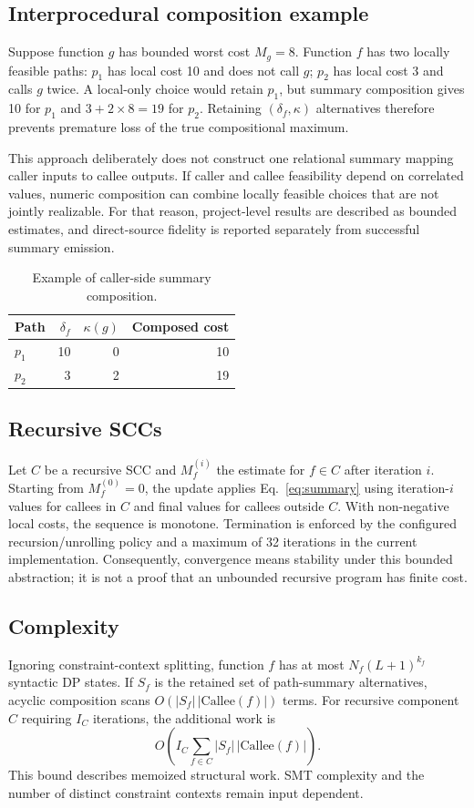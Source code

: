 \documentclass[10pt,conference]{IEEEtran}
\begin{document}
\subsection{Interprocedural composition example}
Suppose function $g$ has bounded worst cost $M_g=8$. Function $f$ has two locally feasible paths: $p_1$ has local cost 10 and does not call $g$; $p_2$ has local cost 3 and calls $g$ twice. A local-only choice would retain $p_1$, but summary composition gives 10 for $p_1$ and $3+2\times8=19$ for $p_2$. Retaining $(\delta_f,\kappa)$ alternatives therefore prevents premature loss of the true compositional maximum.

This approach deliberately does not construct one relational summary mapping caller inputs to callee outputs. If caller and callee feasibility depend on correlated values, numeric composition can combine locally feasible choices that are not jointly realizable. For that reason, project-level results are described as bounded estimates, and direct-source fidelity is reported separately from successful summary emission.

\begin{table}[t]
\centering
\caption{Example of caller-side summary composition.}
\label{tab:summary-example}
\begin{tabular}{lrrr}
\toprule
Path & $\delta_f$ & $\kappa(g)$ & Composed cost\\
\midrule
$p_1$ & 10 & 0 & 10\\
$p_2$ & 3 & 2 & 19\\
\bottomrule
\end{tabular}
\end{table}

\subsection{Recursive SCCs}
Let $C$ be a recursive SCC and $M_f^{(i)}$ the estimate for $f\in C$ after iteration $i$. Starting from $M_f^{(0)}=0$, the update applies Eq.~\ref{eq:summary} using iteration-$i$ values for callees in $C$ and final values for callees outside $C$. With non-negative local costs, the sequence is monotone. Termination is enforced by the configured recursion/unrolling policy and a maximum of 32 iterations in the current implementation. Consequently, convergence means stability under this bounded abstraction; it is not a proof that an unbounded recursive program has finite cost.

\subsection{Complexity}
Ignoring constraint-context splitting, function $f$ has at most $N_f(L+1)^{k_f}$ syntactic DP states. If $S_f$ is the retained set of path-summary alternatives, acyclic composition scans $O(|S_f|\,|\mathrm{Callee}(f)|)$ terms. For recursive component $C$ requiring $I_C$ iterations, the additional work is
\begin{equation}
O\!\left(I_C\sum_{f\in C}|S_f|\,|\mathrm{Callee}(f)|\right).
\end{equation}
This bound describes memoized structural work. SMT complexity and the number of distinct constraint contexts remain input dependent.
\end{document}
